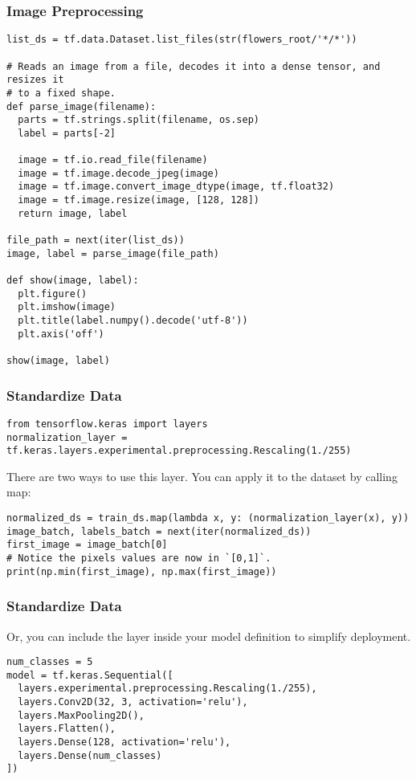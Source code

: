 \begin{frame}[fragile]\frametitle{Image Preprocessing}

\begin{lstlisting}
list_ds = tf.data.Dataset.list_files(str(flowers_root/'*/*'))

# Reads an image from a file, decodes it into a dense tensor, and resizes it
# to a fixed shape.
def parse_image(filename):
  parts = tf.strings.split(filename, os.sep)
  label = parts[-2]

  image = tf.io.read_file(filename)
  image = tf.image.decode_jpeg(image)
  image = tf.image.convert_image_dtype(image, tf.float32)
  image = tf.image.resize(image, [128, 128])
  return image, label
	
file_path = next(iter(list_ds))
image, label = parse_image(file_path)

def show(image, label):
  plt.figure()
  plt.imshow(image)
  plt.title(label.numpy().decode('utf-8'))
  plt.axis('off')

show(image, label)
\end{lstlisting}
\end{frame}

\begin{frame}[fragile]\frametitle{Standardize Data}

\begin{lstlisting}
from tensorflow.keras import layers
normalization_layer = tf.keras.layers.experimental.preprocessing.Rescaling(1./255)
\end{lstlisting}

There are two ways to use this layer. You can apply it to the dataset by calling map:

\begin{lstlisting}
normalized_ds = train_ds.map(lambda x, y: (normalization_layer(x), y))
image_batch, labels_batch = next(iter(normalized_ds))
first_image = image_batch[0]
# Notice the pixels values are now in `[0,1]`.
print(np.min(first_image), np.max(first_image)) 
\end{lstlisting}


\end{frame}

\begin{frame}[fragile]\frametitle{Standardize Data}

Or, you can include the layer inside your model definition to simplify deployment.

\begin{lstlisting}
num_classes = 5
model = tf.keras.Sequential([
  layers.experimental.preprocessing.Rescaling(1./255),
  layers.Conv2D(32, 3, activation='relu'),
  layers.MaxPooling2D(),
  layers.Flatten(),
  layers.Dense(128, activation='relu'),
  layers.Dense(num_classes)
])
\end{lstlisting}

\end{frame}


